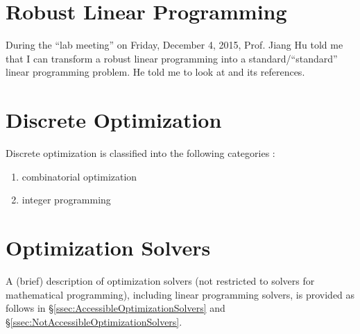 \section{Robust Linear Programming}
\label{sec:RobustLinearProgramming}


During the ``lab meeting'' on Friday, December 4, 2015, Prof. Jiang Hu told me that I can transform a robust linear programming into a standard/``standard'' linear programming problem. He told me to look at \cite{Bertsimas2004} and its references.




\section{Discrete Optimization}
\label{sec:DiscreteOptimization}

Discrete optimization is classified into the following categories \cite{WikipediaContributors2015h,Hammer1979,Lee2004c}: \vspace{-0.3cm}
\begin{enumerate} \itemsep -4pt
\item combinatorial optimization
\item integer programming
\end{enumerate}








\section{Optimization Solvers}
\label{sec:OptimizationSolvers}

A (brief) description of optimization solvers (not restricted to solvers for mathematical programming), including linear programming solvers, is provided as follows in \S\ref{ssec:AccessibleOptimizationSolvers} and \S\ref{ssec:NotAccessibleOptimizationSolvers}. \\














